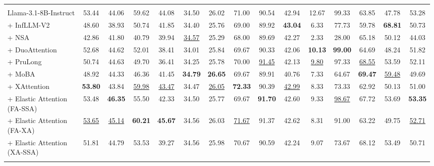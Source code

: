 \begin{table}[t]
{\begin{tabular}{l|ccccccccccccc|c}
\arrayrulecolor{black}\midrule
\rowcolor{cyan!20}
\multicolumn{15}{c}{\textbf{Llama-3.1-8B-Instruct 骨干模型}} \\
\arrayrulecolor{black!20}\midrule
Llama-3.1-8B-Instruct & 53.44 & 44.06 & 59.62 & 44.08 & 34.50 & 26.02 & 71.00 & 90.54 & 42.94 & 12.67 & 99.33 & 63.85 & 47.78 & 53.28 \\
+ InfLLM-V2 & 48.60 & 38.93 & 50.74 & 41.85 & 34.40 & 25.76 & 69.00 & 89.92 & \textbf{43.04} & 6.33 & 77.73 & 59.78 & \textbf{68.81} & 50.73 \\
+ NSA & 42.86 & 41.80 & 40.79 & 39.94 & \underline{34.57} & 25.29 & 68.00 & 89.69 & 42.27 & 2.33 & 28.00 & 65.18 & 50.12 & 44.03 \\
+ DuoAttention & 52.68 & 44.62 & 52.01 & 38.41 & 34.01 & 25.84 & 69.67 & 90.33 & 42.06 & \textbf{10.13} & \textbf{99.00} & 64.69 & 48.24 & 51.82 \\
+ PruLong & 50.74 & 44.63 & 49.70 & 36.41 & 34.25 & 25.78 & 70.00 & \underline{91.45} & 42.13 & \underline{9.80} & 97.33 & \underline{68.55} & 53.59 & 52.11 \\
+ MoBA & 48.92 & 44.33 & 46.36 & 41.45 & \textbf{34.79} & \textbf{26.65} & 69.67 & 89.91 & 40.76 & 7.33 & 64.67 & \textbf{69.47} & \underline{59.48} & 49.69 \\
+ XAttention & \textbf{53.80} & 43.84 & \underline{59.98} & \underline{43.47} & 34.47 & \underline{26.05} & \textbf{72.33} & 90.39 & \underline{42.99} & 8.33 & 73.33 & 62.92 & 50.13 & 51.00 \\
\arrayrulecolor{black!40}\midrule
+ Elastic Attention (FA-SSA) & 53.48 & \textbf{46.35} & 55.50 & 42.33 & 34.50 & 25.77 & 69.67 & \textbf{91.70} & 42.60 & 9.33 & \underline{98.67} & 67.72 & 53.69 & \textbf{53.35} \\
+ Elastic Attention (FA-XA) & \underline{53.65} & \underline{45.14} & \textbf{60.21} & \textbf{45.67} & 34.56 & 26.03 & \underline{71.67} & 91.37 & 42.62 & 8.31 & 91.00 & 63.22 & 49.75 & \underline{52.71} \\
+ Elastic Attention (XA-SSA) & 51.81 & 44.79 & 53.53 & 39.27 & 34.56 & 25.98 & 70.67 & 90.59 & 42.24 & 9.07 & 73.67 & 68.12 & 53.49 & 50.71 \\
\arrayrulecolor{black}\bottomrule
\end{tabular}
}
\label{tab:longbench_subtask_results}
\end{table}
